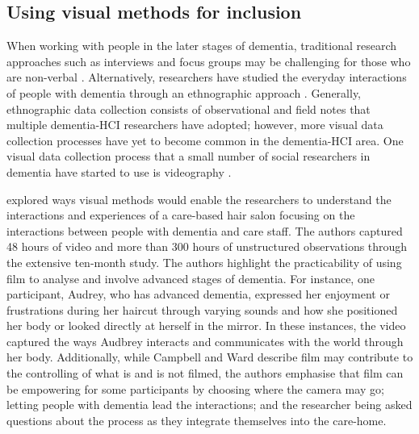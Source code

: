 \subsection{Using visual methods for inclusion}
When working with people in the later stages of dementia, traditional research approaches such as interviews and focus groups may be challenging for those who are non-verbal \citep{swarbrick2015quest}. Alternatively, researchers have studied the everyday interactions of people with dementia through an ethnographic approach \citep{kontos_ethnographic_2004,morrissey_value_2017,foley_care_2019}. Generally, ethnographic data collection consists of observational and field notes that multiple dementia-HCI researchers have adopted; however, more visual data collection processes have yet to become common in the dementia-HCI area. One visual data collection process that a small number of social researchers in dementia have started to use is videography \citep{phillipson2018more}.

\cite{campbell2017video} explored ways visual methods would enable the researchers to understand the interactions and experiences of a care-based hair salon focusing on the interactions between people with dementia and care staff. The authors captured 48 hours of video and more than 300 hours of unstructured observations through the extensive ten-month study. The authors highlight the practicability of using film to analyse and involve advanced stages of dementia. For instance, one participant, Audrey, who has advanced dementia, expressed her enjoyment or frustrations during her haircut through varying sounds and how she positioned her body or looked directly at herself in the mirror. In these instances, the video captured the ways Audbrey interacts and communicates with the world through her body. Additionally, while Campbell and Ward describe film may contribute to the controlling of what is and is not filmed, the authors emphasise that film can be empowering for some participants by choosing where the camera may go; letting people with dementia lead the interactions; and the researcher being asked questions about the process as they integrate themselves into the care-home. 

